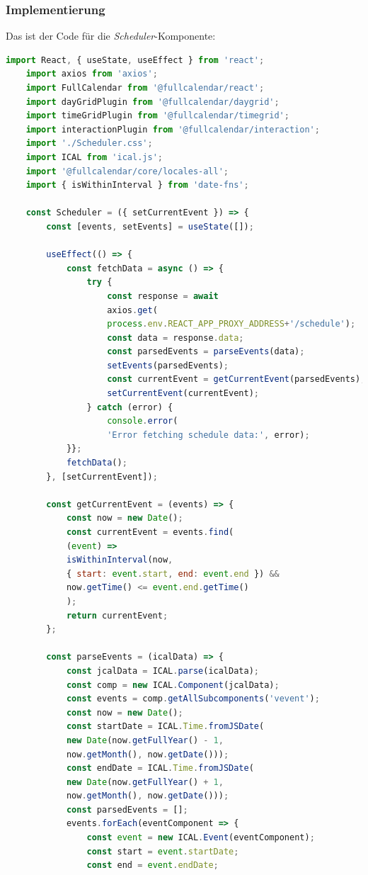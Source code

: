 \subsubsection{Implementierung}
Das ist der Code für die \emph{Scheduler}-Komponente:
\begin{lstlisting}[language=JavaScript,
	frame=single,           % Ein Rahmen um den Code
	framexleftmargin=15pt,  % Rahmen link von den Zahlen
	style=algoBericht,
	label={Scheduler-Komponente},
	captionpos=b ,          % Caption unter den Code setzen
	caption={Scheduler-Komponente}]
	import React, { useState, useEffect } from 'react';
	import axios from 'axios';
	import FullCalendar from '@fullcalendar/react';
	import dayGridPlugin from '@fullcalendar/daygrid';
	import timeGridPlugin from '@fullcalendar/timegrid';
	import interactionPlugin from '@fullcalendar/interaction';
	import './Scheduler.css';
	import ICAL from 'ical.js';
	import '@fullcalendar/core/locales-all';
	import { isWithinInterval } from 'date-fns';
	
	const Scheduler = ({ setCurrentEvent }) => {
		const [events, setEvents] = useState([]);
		
		useEffect(() => {
			const fetchData = async () => {
				try {
					const response = await 
					axios.get(
					process.env.REACT_APP_PROXY_ADDRESS+'/schedule');
					const data = response.data;
					const parsedEvents = parseEvents(data);
					setEvents(parsedEvents);
					const currentEvent = getCurrentEvent(parsedEvents);
					setCurrentEvent(currentEvent);
				} catch (error) {
					console.error(
					'Error fetching schedule data:', error);
			}};
			fetchData();
		}, [setCurrentEvent]);
		
		const getCurrentEvent = (events) => {
			const now = new Date();
			const currentEvent = events.find(
			(event) =>
			isWithinInterval(now, 
			{ start: event.start, end: event.end }) &&
			now.getTime() <= event.end.getTime()
			);
			return currentEvent;
		};
		
		const parseEvents = (icalData) => {
			const jcalData = ICAL.parse(icalData);
			const comp = new ICAL.Component(jcalData);
			const events = comp.getAllSubcomponents('vevent');
			const now = new Date();
			const startDate = ICAL.Time.fromJSDate(
			new Date(now.getFullYear() - 1, 
			now.getMonth(), now.getDate()));
			const endDate = ICAL.Time.fromJSDate(
			new Date(now.getFullYear() + 1, 
			now.getMonth(), now.getDate()));
			const parsedEvents = [];
			events.forEach(eventComponent => {
				const event = new ICAL.Event(eventComponent);
				const start = event.startDate;
				const end = event.endDate;
				

\end{lstlisting}
